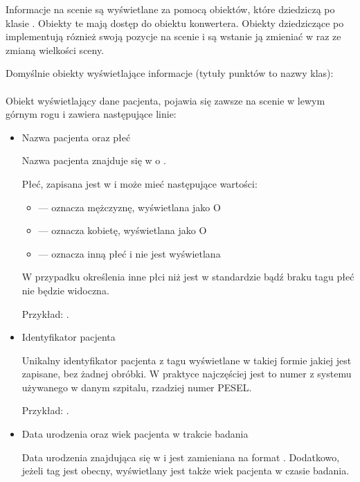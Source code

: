 
Informacje na scenie są wyświetlane za pomocą obiektów, które dziedziczą po klasie .
Obiekty te mają dostęp do obiektu konwertera.
Obiekty dziedziczące po  implementują róznież swoją pozycje na scenie i są wstanie ją zmieniać w raz ze zmianą wielkości sceny.

Domyślnie obiekty wyświetlające informacje (tytuły punktów to nazwy klas):
\paragraph{}

Obiekt wyświetlający dane pacjenta, pojawia się zawsze na scenie w lewym górnym rogu i zawiera następujące linie:
\begin{itemize}
    \item Nazwa pacjenta oraz płeć

          Nazwa pacjenta znajduje się w  o .

          Płeć, zapisana jest w  i może mieć następujące wartości:
          \begin{itemize}
              \item {} --- oznacza mężczyznę, wyświetlana jako O
              \item {} --- oznacza kobietę, wyświetlana jako O
              \item {} --- oznacza inną płeć i nie jest wyświetlana
          \end{itemize}

          W przypadku określenia inne płci niż jest w standardzie bądź braku tagu płeć nie będzie widoczna.

          Przykład: .

    \item Identyfikator pacjenta

          Unikalny identyfikator pacjenta z tagu  wyświetlane w takiej formie jakiej jest zapisane, bez żadnej obróbki.
          W praktyce najczęściej jest to numer z systemu używanego w danym szpitalu, rzadziej numer PESEL.

          Przykład: .

    \item Data urodzenia oraz wiek pacjenta w trakcie badania

          Data urodzenia znajdująca się w  i jest zamieniana na format .
          Dodatkowo, jeżeli tag  jest obecny, wyświetlany jest także wiek pacjenta w czasie badania.


\end{itemize}
